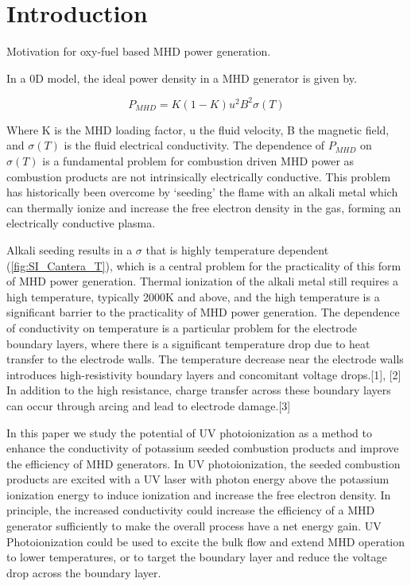 

\section{Introduction}

Motivation for oxy-fuel based MHD power generation. 

In a 0D model, the ideal power density in a MHD generator is given by. 

\begin{equation}
P_{MHD} = K(1-K) u^2 B^2 \sigma(T)
\label{eq:mhd_ideal_power}
\end{equation}


Where K is the MHD loading factor, u the fluid velocity, B the magnetic field, and $\sigma(T)$ is the fluid electrical conductivity. The dependence of $P_{MHD}$ on $\sigma(T)$ is a fundamental problem for combustion driven MHD power as combustion products are not intrinsically electrically conductive. This problem has historically been overcome by ‘seeding’ the flame with an alkali metal which can thermally ionize and increase the free electron density in the gas, forming an electrically conductive plasma.  

Alkali seeding results in a $\sigma$ that is highly temperature dependent (\ref{fig:SI_Cantera_T}), which is a central problem for the practicality of this form of MHD power generation. Thermal ionization of the alkali metal still requires a high temperature, typically 2000K and above, and the high temperature is a significant barrier to the practicality of MHD power generation. The dependence of conductivity on temperature is a particular problem for the electrode boundary layers, where there is a significant temperature drop due to heat transfer to the electrode walls. The temperature decrease near the electrode walls introduces high-resistivity boundary layers and concomitant voltage drops.[1], [2] In addition to the high resistance, charge transfer across these boundary layers can occur through arcing and lead to electrode damage.[3] 


In this paper we study the potential of UV photoionization as a method to enhance the conductivity of potassium seeded combustion products and improve the efficiency of MHD generators. In UV photoionization, the seeded combustion products are excited with a UV laser with photon energy above the potassium ionization energy to induce ionization and increase the free electron density. In principle, the increased conductivity could increase the efficiency of a MHD generator sufficiently to make the overall process have a net energy gain. UV Photoionization could be used to excite the bulk flow and extend MHD operation to lower temperatures, or to target the boundary layer and reduce the voltage drop across the boundary layer.



